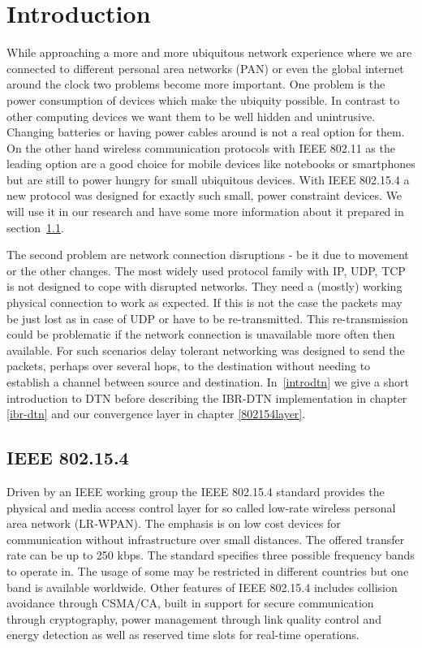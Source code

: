 \chapter{Introduction}
While approaching a more and more ubiquitous network experience where we are
connected to different personal area networks (PAN) or even the global internet
around the clock two problems become more important. One problem is the power
consumption of devices which make the ubiquity possible. In contrast to other
computing devices we want them to be well hidden and unintrusive. Changing
batteries or having power cables around is not a real option for them. On the
other hand wireless communication protocols with IEEE 802.11 \cite{ieee80211} as the
leading option are a good choice for mobile devices like notebooks or
smartphones but are still to power hungry for small ubiquitous devices.
With IEEE 802.15.4 \cite{ieee802154} a new protocol was designed for exactly such
small, power constraint devices. We will use it in our research and have some
more information about it prepared in section~\ref{intro802154}.

The second problem are network connection disruptions - be it due to movement or
the other changes. The most widely used protocol family with IP, UDP, TCP is not
designed to cope with disrupted networks. They need a (mostly) working physical connection
to work as expected. If this is not the case the packets may be just lost
as in case of UDP or have to be re-transmitted. This re-transmission could be
problematic if the network connection is unavailable more often then available.
For such scenarios delay tolerant networking was designed to send the
packets, perhaps over several hops, to the destination without needing to
establish a channel between source and destination. In~\ref{introdtn} we give a
short introduction to DTN before describing the IBR-DTN implementation in chapter
\ref{ibr-dtn} and our convergence layer in chapter \ref{802154layer}.

\section{IEEE 802.15.4}
\label{intro802154}
Driven by an IEEE working group the IEEE 802.15.4 standard provides the physical and
media access control layer for so called low-rate wireless personal area network
(LR-WPAN). The emphasis is on low cost devices for communication without
infrastructure over small distances. The offered transfer rate can be up to 250 kbps.
The standard specifies three possible frequency bands to operate in. The usage of
some may be restricted in different countries but one band is available worldwide.
Other features of IEEE 802.15.4 includes collision avoidance through CSMA/CA, built
in support for secure communication through cryptography, power management through
link quality control and energy detection as well as reserved time slots for
real-time operations.

